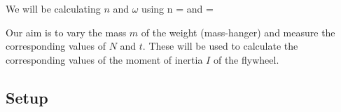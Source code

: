     \eline
    We will be calculating $n$ and $\omega$ using
    \beq \label{n}
        n = 
    \eeq
    and
    \beq \label{omega}
        \omega = 
    \eeq

    Our aim is to vary the mass $m$ of the weight (mass-hanger) and measure the corresponding values of $N$ and $t$. These will be used to calculate the corresponding values of the moment of inertia $I$ of the flywheel.

    \subsection{Setup}
